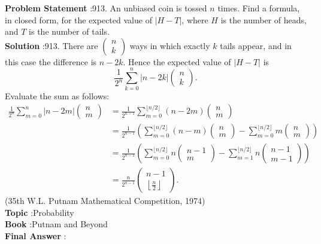 \documentclass[10pt]{article}
\begin{document}
\textbf{Problem Statement} :913. An unbiased coin is tossed $n$ times. Find a formula, in closed form, for the expected value of $|H-T|$, where $H$ is the number of heads, and $T$ is the number of tails.\\
\textbf{Solution} :913. There are $\left(\begin{array}{l}n \\ k\end{array}\right)$ ways in which exactly $k$ tails appear, and in this case the difference is $n-2 k$. Hence the expected value of $|H-T|$ is$$ \frac{1}{2^{n}} \sum_{k=0}^{n}|n-2 k|\left(\begin{array}{l} n \\ k \end{array}\right) . $$Evaluate the sum as follows:$$ \begin{aligned} \frac{1}{2^{n}} \sum_{m=0}^{n}|n-2 m|\left(\begin{array}{c} n \\ m \end{array}\right) &=\frac{1}{2^{n-1}} \sum_{m=0}^{\lfloor n / 2\rfloor}(n-2 m)\left(\begin{array}{c} n \\ m \end{array}\right) \\ &=\frac{1}{2^{n-1}}\left(\sum_{m=0}^{\lfloor n / 2\rfloor}(n-m)\left(\begin{array}{c} n \\ m \end{array}\right)-\sum_{m=0}^{\lfloor n / 2\rfloor} m\left(\begin{array}{c} n \\ m \end{array}\right)\right) \\ &=\frac{1}{2^{n-1}}\left(\sum_{m=0}^{\lfloor n / 2\rfloor} n\left(\begin{array}{c} n-1 \\ m \end{array}\right)-\sum_{m=1}^{\lfloor n / 2\rfloor} n\left(\begin{array}{c} n-1 \\ m-1 \end{array}\right)\right) \\ &=\frac{n}{2^{n-1}}\left(\begin{array}{c} n-1 \\ \left\lfloor\frac{n}{2}\right\rfloor \end{array}\right) . \end{aligned} $$(35th W.L. Putnam Mathematical Competition, 1974)\\
\textbf{Topic} :Probability\\
\textbf{Book} :Putnam and Beyond\\
\textbf{Final Answer} :\\
\end{document}
